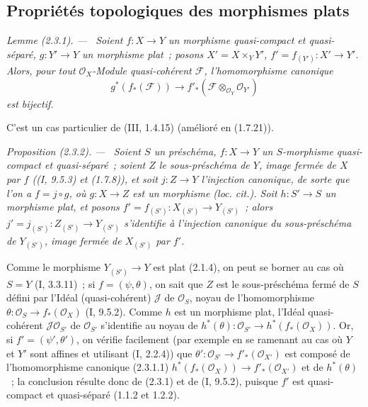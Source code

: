 \documentclass[10pt,oneside]{book}
\makeatletter
\newenvironment{proposition}[1][]{%
  \par\medskip\noindent\itshape Proposition (#1). ---\ }{\par}
\newenvironment{lemma}[1][]{%
  \par\medskip\noindent\itshape Lemme (#1). ---\ }{\par}
\newcommand{\EGAReaderTarget}[2]{\hypertarget{#1}{}\@bsphack\begingroup\def\@currentHref{#1}\label{#2}\endgroup\@esphack}
\makeatother
\begin{document}
\subsection{Propriétés topologiques des morphismes plats}
\label{subsection:IV.2.3-fr}

\begin{lemma}[2.3.1]
\EGAReaderTarget{ega4.c04.lem.2-3-1}{IV.2.3.1-fr}
Soient $f:X\to Y$ un morphisme quasi-compact et quasi-séparé,
$g:Y'\to Y$ un morphisme plat~; posons $X'=X\times_Y Y'$,
$f'=f_{(Y')}:X'\to Y'$. Alors, pour tout $\mathcal O_X$-Module quasi-cohérent
$\mathscr F$, l'homomorphisme canonique
\begin{equation}
\tag{2.3.1.1}
\label{IV.2.3.1.1-fr}
  g^*(f_*(\mathscr F))\to
  f'_*(\mathscr F\otimes_{\mathcal O_Y}\mathcal O_{Y'})
\end{equation}
est bijectif.
\end{lemma}

C'est un cas particulier de (III, 1.4.15) (amélioré en (1.7.21)).

\begin{proposition}[2.3.2]
\label{IV.2.3.2-fr}
Soient $S$ un préschéma, $f:X\to Y$ un $S$-morphisme quasi-compact et
quasi-séparé~; soient $Z$ le sous-préschéma de $Y$, image fermée de $X$ par
$f$ ((I, 9.5.3) et (1.7.8)), et soit $j:Z\to Y$ l'injection canonique, de
sorte que l'on a $f=j\circ g$, où $g:X\to Z$ est un morphisme
(\emph{loc. cit.}). Soit $h:S'\to S$ un morphisme plat, et posons
$f'=f_{(S')}:X_{(S')}\to Y_{(S')}$~; alors
$j'=j_{(S')}:Z_{(S')}\to Y_{(S')}$ s'identifie à l'injection canonique du
sous-préschéma de $Y_{(S')}$, image fermée de $X_{(S')}$ par $f'$.
\end{proposition}

Comme le morphisme $Y_{(S')}\to Y$ est plat (2.1.4), on peut se borner au cas
où $S=Y$ (I, 3.3.11)~; si $f=(\psi,\theta)$, on sait que $Z$ est le
sous-préschéma fermé de $S$ défini par l'Idéal (quasi-cohérent) $\mathscr J$
de $\mathcal O_S$, noyau de l'homomorphisme
$\theta:\mathcal O_S\to f_*(\mathcal O_X)$ (I, 9.5.2). Comme $h$ est un
morphisme plat, l'Idéal quasi-cohérent $\mathscr J\mathcal O_{S'}$ de
$\mathcal O_{S'}$ s'identifie au noyau de
$h^*(\theta):\mathcal O_{S'}\to h^*(f_*(\mathcal O_X))$. Or, si
$f'=(\psi',\theta')$, on vérifie facilement (par exemple en se ramenant au
cas où $Y$ et $Y'$ sont affines et utilisant (I, 2.2.4)) que
$\theta':\mathcal O_{S'}\to f'_*(\mathcal O_{X'})$ est composé de
l'homomorphisme canonique (2.3.1.1)
$h^*(f_*(\mathcal O_X))\to f'_*(\mathcal O_{X'})$ et de $h^*(\theta)$~; la
conclusion résulte donc de (2.3.1) et de (I, 9.5.2), puisque $f'$ est
quasi-compact et quasi-séparé (1.1.2 et 1.2.2).
\end{document}

